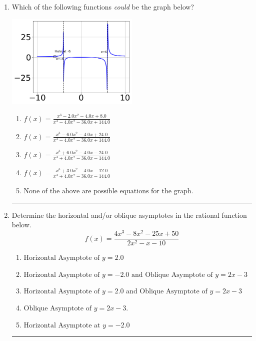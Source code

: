\documentclass[14pt]{extbook}
\newcommand{\litem}[1]{\item#1\hspace*{-1cm}\rule{\textwidth}{0.4pt}}
\begin{document}
\begin{enumerate}
{\begin{enumerate}[label=\Alph*.]
\end{enumerate} }
\litem{
Which of the following functions \textit{could} be the graph below?
\begin{center}
    \includegraphics[width=0.5\textwidth]{../Figures/identifyGraphOfRationalFunctionC.png}
\end{center}
\begin{enumerate}[label=\Alph*.]
\item \( f(x)=\frac{x^{3} -2.0 x^{2} -4.0 x + 8.0}{x^{3} -4.0 x^{2} -36.0 x + 144.0} \)
\item \( f(x)=\frac{x^{3} -6.0 x^{2} -4.0 x + 24.0}{x^{3} -4.0 x^{2} -36.0 x + 144.0} \)
\item \( f(x)=\frac{x^{3} +6.0 x^{2} -4.0 x -24.0}{x^{3} +4.0 x^{2} -36.0 x -144.0} \)
\item \( f(x)=\frac{x^{3} +3.0 x^{2} -4.0 x -12.0}{x^{3} +4.0 x^{2} -36.0 x -144.0} \)
\item \( \text{None of the above are possible equations for the graph.} \)

\end{enumerate} }
\litem{
Determine the horizontal and/or oblique asymptotes in the rational function below.\[ f(x) = \frac{4x^{3} -8 x^{2} -25 x + 50}{2x^{2} -x -10} \]\begin{enumerate}[label=\Alph*.]
\item \( \text{Horizontal Asymptote of } y = 2.0  \)
\item \( \text{Horizontal Asymptote of } y = -2.0 \text{ and Oblique Asymptote of } y = 2x -3 \)
\item \( \text{Horizontal Asymptote of } y = 2.0 \text{ and Oblique Asymptote of } y = 2x -3 \)
\item \( \text{Oblique Asymptote of } y = 2x -3. \)
\item \( \text{Horizontal Asymptote at } y = -2.0 \)

\end{enumerate} }
\end{enumerate}
\end{document}
